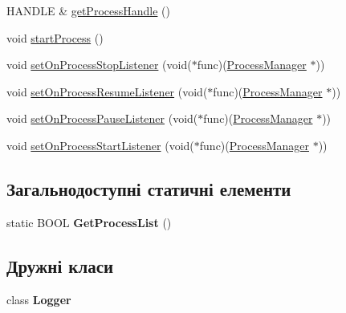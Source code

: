 \begin{DoxyCompactItemize}
\item 
H\+A\+N\+D\+L\+E \& \hyperlink{class_process_manager_a9ef3daadbc5c9fbadf2b27959fa6ad48}{get\+Process\+Handle} ()
\item 
void \hyperlink{class_process_manager_aabe96d5c6ae637b751b512220e5979ec}{start\+Process} ()
\item 
void \hyperlink{class_process_manager_a14bf654b6b333cf41b632c49d9a8efef}{set\+On\+Process\+Stop\+Listener} (void($\ast$func)(\hyperlink{class_process_manager}{Process\+Manager} $\ast$))
\item 
void \hyperlink{class_process_manager_a719434f2fe5c003f355b712dcddad850}{set\+On\+Process\+Resume\+Listener} (void($\ast$func)(\hyperlink{class_process_manager}{Process\+Manager} $\ast$))
\item 
void \hyperlink{class_process_manager_a0c0a42010c6e7949fc6cbebf853cbceb}{set\+On\+Process\+Pause\+Listener} (void($\ast$func)(\hyperlink{class_process_manager}{Process\+Manager} $\ast$))
\item 
void \hyperlink{class_process_manager_a97612a29cefa1f517635e096c1e91691}{set\+On\+Process\+Start\+Listener} (void($\ast$func)(\hyperlink{class_process_manager}{Process\+Manager} $\ast$))
\end{DoxyCompactItemize}
\subsection*{Загальнодоступні статичні елементи}
\begin{DoxyCompactItemize}
\item 
\hypertarget{class_process_manager_a3d9add158edf3b5112981bf231394c41}{static B\+O\+O\+L {\bfseries Get\+Process\+List} ()}\label{class_process_manager_a3d9add158edf3b5112981bf231394c41}

\end{DoxyCompactItemize}
\subsection*{Дружні класи}
\begin{DoxyCompactItemize}
\item 
\hypertarget{class_process_manager_aff02b76416d2846736b7ecd798921a0a}{class {\bfseries Logger}}\label{class_process_manager_aff02b76416d2846736b7ecd798921a0a}

\end{DoxyCompactItemize}


